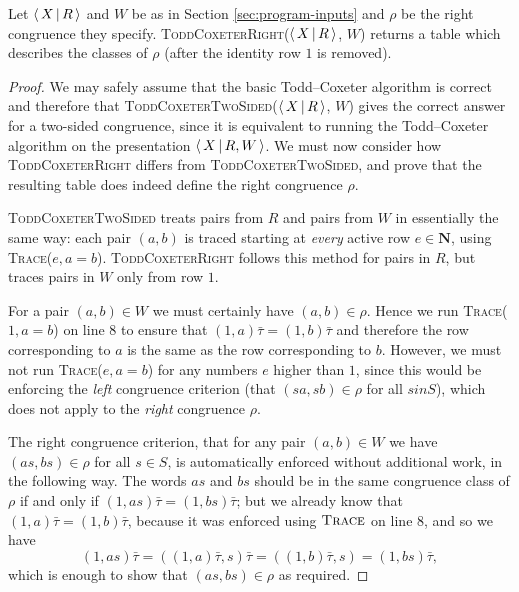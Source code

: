 \begin{theorem}
  Let $\left\langle \, X \, \middle| \, R \, \right\rangle$ and $W$ be as in Section \ref{sec:program-inputs} and $\rho$
  be the right congruence they specify.
  \textsc{ToddCoxeterRight($\left\langle \, X \, \middle| \, R \, \right\rangle$, $W$)} returns a table which describes the
  classes of $\rho$ (after the identity row $1$ is removed).
  \begin{proof}
    We may safely assume that the basic Todd--Coxeter algorithm is correct
    \cite{todd_coxeter_1936, beetham_campbell_1976} and therefore that
    \textsc{ToddCoxeterTwoSided($\left\langle \, X \, \middle| \, R \, \right\rangle$, $W$)} gives the correct answer for a
    two-sided congruence, since it is equivalent to running the Todd--Coxeter algorithm on the
    presentation $\left\langle \, X \, \middle| \, R,W \, \right\rangle$.  We must now consider how
    \textsc{ToddCoxeterRight} differs from \textsc{ToddCoxeterTwoSided}, and
    prove that the resulting table does indeed define the right congruence
    $\rho$.

    \textsc{ToddCoxeterTwoSided} treats pairs from $R$ and pairs from $W$ in
    essentially the same way: each pair $(a,b)$ is traced starting at
    \textit{every} active row $e \in \mathbf{N}$, using
    \textsc{Trace}($e, a=b$).  \textsc{ToddCoxeterRight} follows this method for
    pairs in $R$, but traces pairs in $W$ only from row $1$.

    For a pair $(a,b) \in W$ we must certainly have $(a,b) \in \rho$.  Hence we
    run \textsc{Trace($1, a=b$)} on line 8 to ensure that $(1,a)\bar\tau = (1,b)\bar\tau$
    and therefore the row corresponding to $a$ is the same as the row
    corresponding to $b$.  However, we must not run \textsc{Trace($e, a=b$)} for
    any numbers $e$ higher than $1$, since this would be enforcing the
    \textit{left} congruence criterion
    (that $(sa, sb) \in \rho$ for all $s in S$), which does not apply to the
    \textit{right} congruence $\rho$.

    The right congruence criterion, that for any pair $(a,b) \in W$ we have
    $(as, bs) \in \rho$ for all $s \in S$, is automatically enforced without
    additional work, in the following way.  The words $as$ and $bs$ should be in
    the same congruence class of $\rho$ if and only if
    $(1, as)\bar\tau = (1, bs)\bar\tau$; but we already know that
    $(1, a)\bar\tau = (1, b)\bar\tau$, because it was enforced using
    $\textsc{Trace}$ on line 8, and so we have
    $$(1, as)\bar\tau
    = ((1, a)\bar\tau, s)\bar\tau
    = ((1, b)\bar\tau, s)
    = (1, bs)\bar\tau,$$
    which is enough to show that $(as, bs) \in \rho$ as required.
  \end{proof}
\end{theorem}

